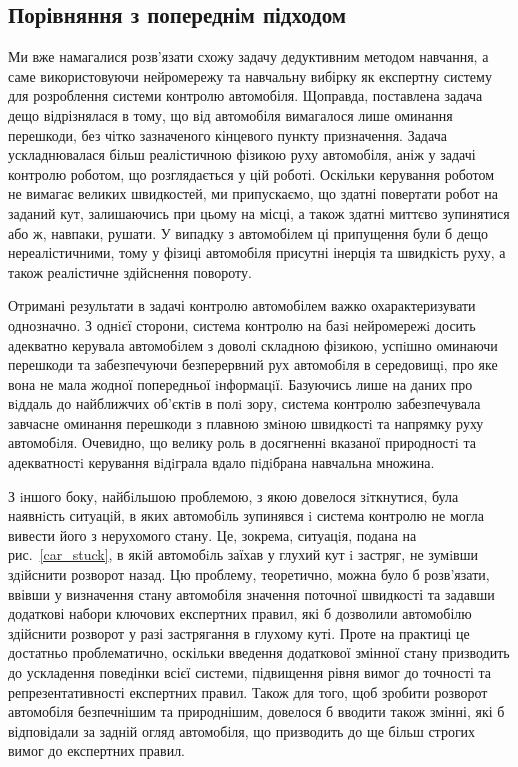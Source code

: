 \subsection{Порівняння з попереднім підходом}

Ми вже намагалися розв'язати схожу задачу дедуктивним методом навчання, а саме використовуючи нейромережу та навчальну вибірку як експертну систему для розроблення системи контролю автомобіля. Щоправда, поставлена задача дещо відрізнялася в тому, що від автомобіля вимагалося лише оминання перешкоди, без чітко зазначеного кінцевого пункту призначення. Задача ускладнювалася більш реалістичною фізикою руху автомобіля, аніж у задачі контролю роботом, що розглядається у цій роботі. Оскільки керування роботом не вимагає великих швидкостей, ми припускаємо, що здатні повертати робот на заданий кут, залишаючись при цьому на місці, а також здатні миттєво зупинятися або ж, навпаки, рушати. У випадку з автомобілем ці припущення були б дещо нереалістичними, тому у фізиці автомобіля присутні інерція та швидкість руху, а також реалістичне здійснення повороту.

Отримані результати в задачі контролю автомобілем важко охарактеризувати однозначно. З однiєї сторони, система контролю на базi нейромережi досить адекватно керувала автомобiлем з доволі складною фізикою, успiшно оминаючи перешкоди та забезпечуючи безперервний рух автомобiля в середовищi, про яке вона не мала жодної попередньої iнформацiї. Базуючись лише на даних про вiддаль до найближчих об’єктiв в полi зору, система контролю забезпечувала завчасне оминання перешкоди з плавною змiною швидкостi та напрямку руху автомобiля. Очевидно, що велику роль в досягненнi вказаної природностi та адекватностi керування вiдiграла вдало пiдiбрана навчальна множина.

З iншого боку, найбiльшою проблемою, з якою довелося зiткнутися, була наявнiсть ситуацiй, в яких автомобiль зупинявся i система контролю не могла вивести його з нерухомого стану. Це, зокрема, ситуацiя, подана на рис.~\ref{car_stuck}, в якiй автомобiль заїхав у глухий кут i застряг, не зумiвши здiйснити розворот назад. Цю проблему, теоретично, можна було б розв'язати, ввівши у визначення стану автомобіля значення поточної швидкості та задавши додаткові набори ключових експертних правил, які б дозволили автомобілю здійснити розворот у разі застрягання в глухому куті. Проте на практиці це достатньо проблематично, оскільки введення додаткової змінної стану призводить до ускладення поведінки всієї системи, підвищення рівня вимог до точності та репрезентативності експертних правил. Також для того, щоб зробити розворот автомобіля безпечнішим та природнішим, довелося б вводити також змінні, які б відповідали за задній огляд автомобіля, що призводить до ще більш строгих вимог до експертних правил.

